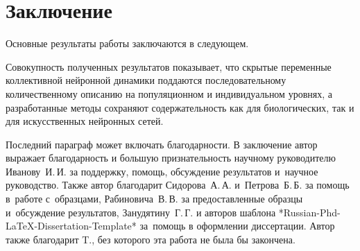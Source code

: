 \chapter*{Заключение}                       %




Основные результаты работы заключаются в следующем.

Совокупность полученных результатов показывает, что скрытые переменные коллективной нейронной динамики поддаются последовательному количественному описанию на популяционном и индивидуальном уровнях, а разработанные методы сохраняют содержательность как для биологических, так и для искусственных нейронных сетей.

Последний параграф может включать благодарности.  В заключение автор
выражает благодарность и большую признательность научному руководителю
Иванову~И.\,И. за поддержку, помощь, обсуждение результатов и~научное
руководство. Также автор благодарит Сидорова~А.\,А. и~Петрова~Б.\,Б.
за помощь в~работе с~образцами, Рабиновича~В.\,В. за предоставленные
образцы и~обсуждение результатов, Занудятину~Г.\,Г. и авторов шаблона
*Russian-Phd-LaTeX-Dissertation-Template* за~помощь в оформлении
диссертации. Автор также благодарит T., без которого эта работа не была бы закончена.

